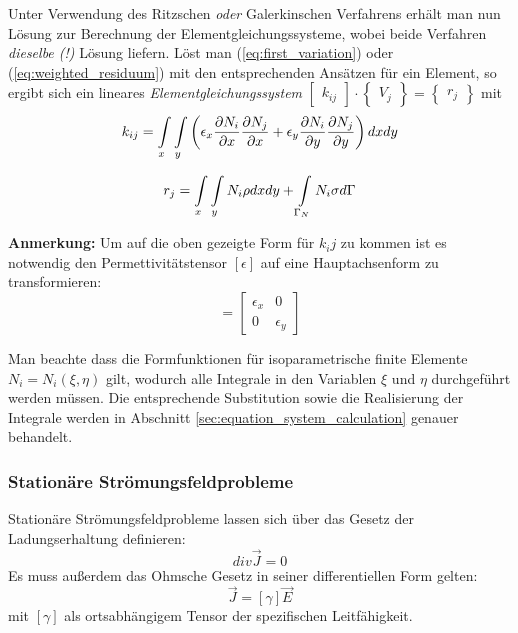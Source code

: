 Unter Verwendung des Ritzschen \textit{oder} Galerkinschen Verfahrens erhält man nun Lösung zur Berechnung der Elementgleichungssysteme, wobei beide Verfahren \textit{dieselbe (!)} Lösung liefern. Löst man (\ref{eq:first_variation}) oder (\ref{eq:weighted_residuum}) mit den entsprechenden Ansätzen für ein Element, so ergibt sich ein lineares \textit{Elementgleichungssystem} $\begin{bmatrix}k_{ij}\end{bmatrix} \cdot \begin{Bmatrix}V_j\end{Bmatrix} = \begin{Bmatrix}r_j\end{Bmatrix}$ mit
\begin{equation}
\label{eq:k_ij_e_static}
k_{ij} = \int\displaylimits_{x} \int\displaylimits_{y} \left(\epsilon_x \frac{\partial N_i}{\partial x}\frac{\partial N_j}{\partial x} +  \epsilon_y\frac{\partial N_i}{\partial y}\frac{\partial N_j}{\partial y}\right)dx dy
\end{equation}

\begin{equation}
\label{eq:right_side_e_static}
	r_j = \int\displaylimits_{x} \int\displaylimits_{y} N_i \rho dx dy + \int\displaylimits_{\Gamma_N} N_i\sigma d\Gamma
\end{equation}

\textbf{Anmerkung:} Um auf die oben gezeigte Form für $k_ij$ zu kommen ist es notwendig den Permettivitätstensor $[\epsilon]$ auf eine Hauptachsenform zu transformieren:
\begin{equation*}
	[\epsilon] = \begin{bmatrix}
	\epsilon_x & 0 \\
	0 & \epsilon_y
	\end{bmatrix}
\end{equation*}

Man beachte dass die Formfunktionen für isoparametrische finite Elemente $N_i = N_i(\xi, \eta)$ gilt, wodurch alle Integrale in den Variablen $\xi$ und $\eta$ durchgeführt werden müssen. Die entsprechende Substitution sowie die Realisierung der Integrale werden in Abschnitt \ref{sec:equation_system_calculation} genauer behandelt. 


\subsubsection{Stationäre Strömungsfeldprobleme}
\label{sec:stat_current_problems}
Stationäre Strömungsfeldprobleme lassen sich über das Gesetz der Ladungserhaltung definieren:
\begin{equation}
	\mathit{div}\vec{J} = 0
\end{equation}
 Es muss außerdem das Ohmsche Gesetz in seiner differentiellen Form gelten:
 \begin{equation}
 	\vec{J} = [\gamma] \vec{E}
 \end{equation}
 mit $[\gamma]$ als ortsabhängigem Tensor der spezifischen Leitfähigkeit.\newline
 
